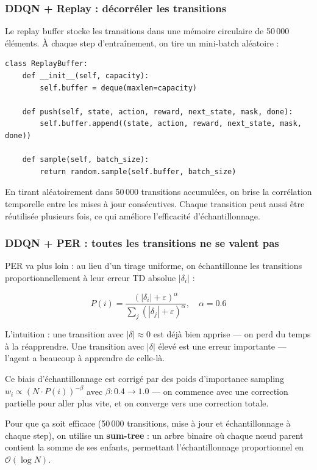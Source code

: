 \documentclass[12pt,a4paper]{article}
\begin{document}
\subsubsection{DDQN + Replay : décorréler les transitions}

Le replay buffer stocke les transitions dans une mémoire circulaire de 50\,000 éléments. À chaque step d'entraînement, on tire un mini-batch aléatoire :

\begin{lstlisting}
class ReplayBuffer:
    def __init__(self, capacity):
        self.buffer = deque(maxlen=capacity)

    def push(self, state, action, reward, next_state, mask, done):
        self.buffer.append((state, action, reward, next_state, mask, done))

    def sample(self, batch_size):
        return random.sample(self.buffer, batch_size)
\end{lstlisting}

En tirant aléatoirement dans 50\,000 transitions accumulées, on brise la corrélation temporelle entre les mises à jour consécutives. Chaque transition peut aussi être réutilisée plusieurs fois, ce qui améliore l'efficacité d'échantillonnage.

\subsubsection{DDQN + PER : toutes les transitions ne se valent pas}

PER va plus loin : au lieu d'un tirage uniforme, on échantillonne les transitions proportionnellement à leur erreur TD absolue $|\delta_i|$ :

\[
P(i) = \frac{(|\delta_i| + \varepsilon)^\alpha}{\sum_j (|\delta_j| + \varepsilon)^\alpha}, \quad \alpha = 0.6
\]

L'intuition : une transition avec $|\delta| \approx 0$ est déjà bien apprise — on perd du temps à la réapprendre. Une transition avec $|\delta|$ élevé est une erreur importante — l'agent a beaucoup à apprendre de celle-là.

Ce biais d'échantillonnage est corrigé par des poids d'importance sampling $w_i \propto (N \cdot P(i))^{-\beta}$ avec $\beta : 0.4 \to 1.0$ — on commence avec une correction partielle pour aller plus vite, et on converge vers une correction totale.

Pour que ça soit efficace (50\,000 transitions, mise à jour et échantillonnage à chaque step), on utilise un \textbf{sum-tree} : un arbre binaire où chaque nœud parent contient la somme de ses enfants, permettant l'échantillonnage proportionnel en $\mathcal{O}(\log N)$.
\end{document}
